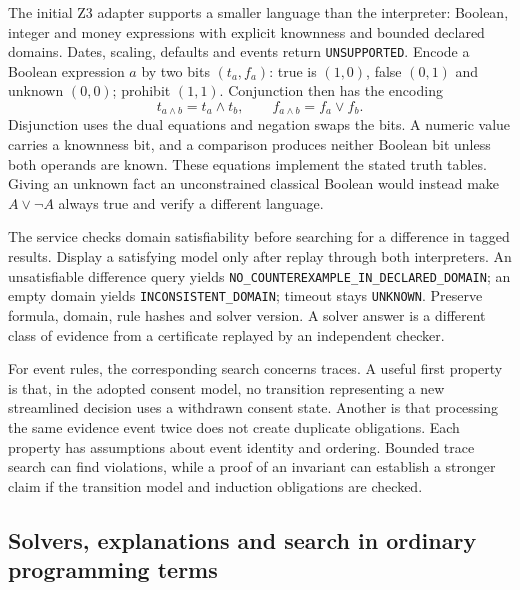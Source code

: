 
The initial Z3 adapter supports a smaller language than the interpreter:
Boolean, integer and money expressions with explicit knownness and bounded
declared domains. Dates, scaling, defaults and events return
\texttt{UNSUPPORTED}. Encode a Boolean expression $a$ by two bits $(t_a,f_a)$:
true is $(1,0)$, false $(0,1)$ and unknown $(0,0)$; prohibit $(1,1)$.
Conjunction then has the encoding
\begin{equation}
 t_{a\land b}=t_a\land t_b,\qquad
 f_{a\land b}=f_a\lor f_b.
 \label{eq:knownness}
\end{equation}
Disjunction uses the dual equations and negation swaps the bits. A numeric value
carries a knownness bit, and a comparison produces neither Boolean bit unless
both operands are known. These equations implement the stated truth tables.
Giving an unknown fact an unconstrained classical Boolean would instead make
$A\lor\neg A$ always true and verify a different language.

The service checks domain satisfiability before searching for a difference in
tagged results. Display a satisfying model only after replay through both
interpreters. An unsatisfiable difference query yields
\texttt{NO\_COUNTEREXAMPLE\_IN\_DECLARED\_DOMAIN}; an empty domain yields
\texttt{INCONSISTENT\_DOMAIN}; timeout stays \texttt{UNKNOWN}. Preserve formula,
domain, rule hashes and solver version. A solver answer is a different class
of evidence from a certificate replayed by an independent checker.

For event rules, the corresponding search concerns traces. A useful first
property is that, in the adopted consent model, no transition representing a new
streamlined decision uses a withdrawn consent state. Another is that processing
the same evidence event twice does not create duplicate obligations. Each
property has assumptions about event identity and ordering. Bounded trace search
can find violations, while a proof of an invariant can establish a stronger
claim if the transition model and induction obligations are checked.

\subsection{Solvers, explanations and search in ordinary programming terms}
\label{merge:P-01a-language-lesson:05}



